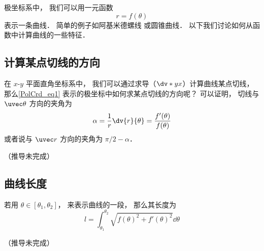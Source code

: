 
\begin{issues}
\issueDraft
\end{issues}


极坐标系中， 我们可以用一元函数
\begin{equation}\label{PolCrd_eq1}
r = f(\theta)
\end{equation}
表示一条曲线． 简单的例子如阿基米德螺线 或圆锥曲线． 以下我们讨论如何从函数中计算曲线的一些特征．

\subsection{计算某点切线的方向}


在 $x$-$y$ 平面直角坐标系中， 我们可以通过求导（$\dv*{y}{x}$）计算曲线某点切线， 那么\autoref{PolCrd_eq1} 表示的极坐标中如何求某点切线的方向呢？ 可以证明， 切线与 $\uvec\theta$ 方向的夹角为
\begin{equation}
\alpha = \frac{1}{r} \dv{r}{\theta} = \frac{f'(\theta)}{f(\theta)}
\end{equation}
或者说与 $\uvec r$ 方向的夹角为 $\pi/2 - \alpha$．

（推导未完成）

\subsection{曲线长度}

若用 $\theta \in [\theta_1, \theta_2]$， 来表示曲线的一段， 那么其长度为
\begin{equation}
l = \int_{\theta_1}^{\theta_2} \sqrt{f(\theta)^2 + f'(\theta)^2} \dd{\theta}
\end{equation}

（推导未完成）
